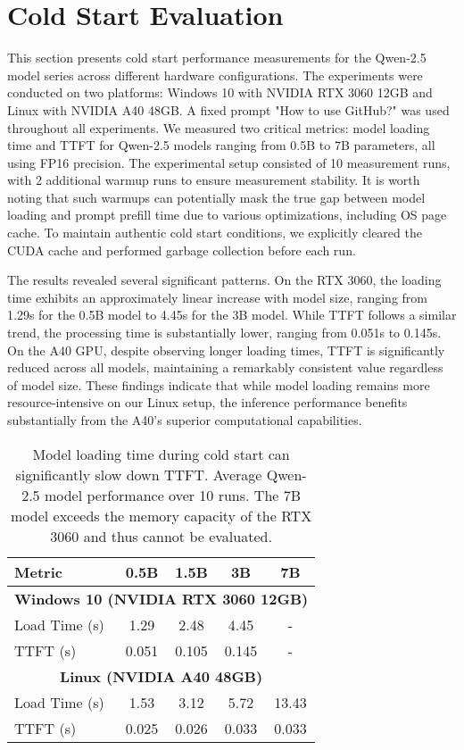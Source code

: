 \section{Cold Start Evaluation}\label{appendix:cold_start}

This section presents cold start performance measurements for the Qwen-2.5 model series across different hardware configurations.
The experiments were conducted on two platforms: Windows 10 with NVIDIA RTX 3060 12GB and Linux with NVIDIA A40 48GB. A fixed prompt "How to use GitHub?" was used throughout all experiments. We measured two critical metrics: model loading time and TTFT for Qwen-2.5 models ranging from 0.5B to 7B parameters, all using FP16 precision. The experimental setup consisted of 10 measurement runs, with 2 additional warmup runs to ensure measurement stability. It is worth noting that such warmups can potentially mask the true gap between model loading and prompt prefill time due to various optimizations, including OS page cache. To maintain authentic cold start conditions, we explicitly cleared the CUDA cache and performed garbage collection before each run.

The results revealed several significant patterns. On the RTX 3060, the loading time exhibits an approximately linear increase with model size, ranging from 1.29s for the 0.5B model to 4.45s for the 3B model. While TTFT follows a similar trend, the processing time is substantially lower, ranging from 0.051s to 0.145s. On the A40 GPU, despite observing longer loading times, TTFT is significantly reduced across all models, maintaining a remarkably consistent value regardless of model size. These findings indicate that while model loading remains more resource-intensive on our Linux setup, the inference performance benefits substantially from the A40's superior computational capabilities.

\begin{table}[ht]
    \centering
    \footnotesize
    \vskip 0.1in
    \begin{tabular}{p{2.5cm}cccc}
    \toprule
    \textbf{Metric} & \textbf{0.5B} & \textbf{1.5B} & \textbf{3B} & \textbf{7B} \\
    \midrule
    \multicolumn{5}{c}{\textbf{Windows 10 (NVIDIA RTX 3060 12GB)}} \\
    \midrule
    Load Time (s) & 1.29 & 2.48 & 4.45 & - \\
    TTFT (s) & 0.051 & 0.105 & 0.145 & - \\
    \midrule
    \multicolumn{5}{c}{\textbf{Linux (NVIDIA A40 48GB)}} \\
    \midrule
    Load Time (s) & 1.53 & 3.12 & 5.72 & 13.43 \\
    TTFT (s) & 0.025 & 0.026 & 0.033 & 0.033 \\
    \bottomrule
    \end{tabular}
    \caption{Model loading time during cold start can significantly slow down TTFT. Average Qwen-2.5 model performance over 10 runs. The 7B model exceeds the memory capacity of the RTX 3060 and thus cannot be evaluated.}
    \label{tab:cold-start}
\end{table}
